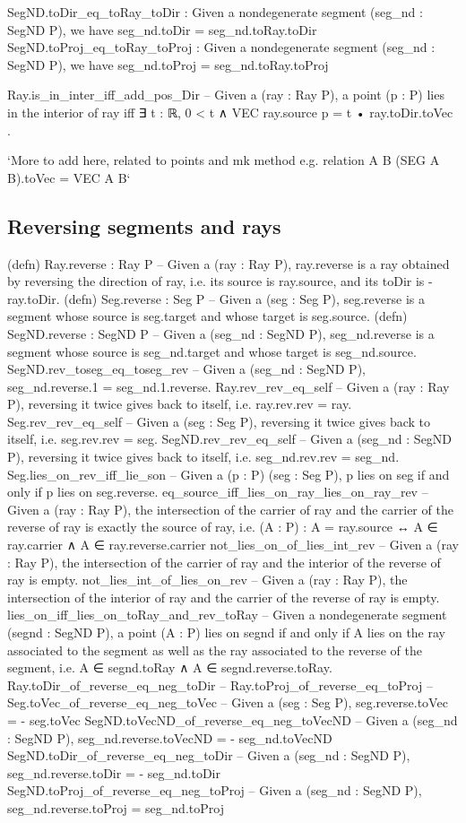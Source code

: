 \documentclass[12pt,a4paper]{article}
\begin{document}
    SegND.toDir_eq_toRay_toDir : Given a nondegenerate segment (seg_nd : SegND P), we have seg_nd.toDir = seg_nd.toRay.toDir
    SegND.toProj_eq_toRay_toProj : Given a nondegenerate segment (seg_nd : SegND P), we have seg_nd.toProj = seg_nd.toRay.toProj

    Ray.is_in_inter_iff_add_pos_Dir -- Given a (ray : Ray P), a point (p : P) lies in the interior of ray iff  ∃ t : ℝ, 0 < t ∧ VEC ray.source p = t • ray.toDir.toVec .

    `More to add here, related to points and mk method e.g. relation A B (SEG A B).toVec = VEC A B`

\subsection{Reversing segments and rays}

    (defn) Ray.reverse : Ray P -- Given a (ray : Ray P), ray.reverse is a ray obtained by reversing the direction of ray, i.e. its source is ray.source, and its toDir is - ray.toDir.
    (defn) Seg.reverse : Seg P -- Given a (seg : Seg P), seg.reverse is a segment whose source is seg.target and whose target is seg.source.
    (defn) SegND.reverse : SegND P -- Given a (seg_nd : SegND P), seg_nd.reverse is a segment whose source is seg_nd.target and whose target is seg_nd.source.
    SegND.rev_toseg_eq_toseg_rev -- Given a (seg_nd : SegND P), seg_nd.reverse.1 = seg_nd.1.reverse.
    Ray.rev_rev_eq_self -- Given a (ray : Ray P), reversing it twice gives back to itself, i.e. ray.rev.rev = ray.
    Seg.rev_rev_eq_self -- Given a (seg : Seg P), reversing it twice gives back to itself, i.e. seg.rev.rev = seg.
    SegND.rev_rev_eq_self -- Given a (seg_nd : SegND P), reversing it twice gives back to itself, i.e. seg_nd.rev.rev = seg_nd.
    Seg.lies_on_rev_iff_lie_son -- Given a (p : P) (seg : Seg P), p lies on seg if and only if p lies on seg.reverse.
    eq_source_iff_lies_on_ray_lies_on_ray_rev -- Given a (ray : Ray P), the intersection of the carrier of ray and the carrier of the reverse of ray is exactly the source of ray, i.e. (A : P) : A = ray.source ↔ A ∈ ray.carrier ∧ A ∈ ray.reverse.carrier
    not_lies_on_of_lies_int_rev -- Given a (ray : Ray P), the intersection of the carrier of ray and the interior of the reverse of ray is empty.
    not_lies_int_of_lies_on_rev -- Given a (ray : Ray P), the intersection of the interior of ray and the carrier of the reverse of ray is empty.
    lies_on_iff_lies_on_toRay_and_rev_toRay -- Given a nondegenerate segment (segnd : SegND P), a point (A : P) lies on segnd if and only if A lies on the ray associated to the segment as well as the ray associated to the reverse of the segment, i.e. A ∈ segnd.toRay ∧ A ∈ segnd.reverse.toRay.
    Ray.toDir_of_reverse_eq_neg_toDir --
    Ray.toProj_of_reverse_eq_toProj --
    Seg.toVec_of_reverse_eq_neg_toVec -- Given a (seg : Seg P), seg.reverse.toVec = - seg.toVec
    SegND.toVecND_of_reverse_eq_neg_toVecND -- Given a (seg_nd : SegND P), seg_nd.reverse.toVecND = - seg_nd.toVecND
    SegND.toDir_of_reverse_eq_neg_toDir -- Given a (seg_nd : SegND P), seg_nd.reverse.toDir = - seg_nd.toDir
    SegND.toProj_of_reverse_eq_neg_toProj -- Given a (seg_nd : SegND P), seg_nd.reverse.toProj = seg_nd.toProj
\end{document}
